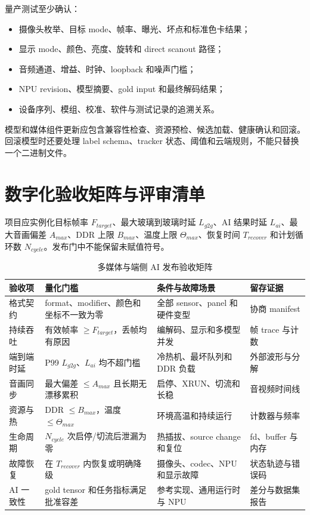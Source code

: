 量产测试至少确认：

\begin{itemize}
  \item 摄像头枚举、目标 mode、帧率、曝光、坏点和标准色卡结果；
  \item 显示 mode、颜色、亮度、旋转和 direct scanout 路径；
  \item 音频通道、增益、时钟、loopback 和噪声门槛；
  \item NPU revision、模型摘要、gold input 和最终解码结果；
  \item 设备序列、模组、校准、软件与测试记录的追溯关系。
\end{itemize}

模型和媒体组件更新应包含兼容性检查、资源预检、候选加载、健康确认和回滚。回滚模型时还要处理 label schema、tracker 状态、阈值和云端规则，不能只替换一个二进制文件。

\section{数字化验收矩阵与评审清单}

项目应实例化目标帧率 $F_{target}$、最大玻璃到玻璃时延 $L_{g2g}$、AI 结果时延 $L_{ai}$、最大音画偏差 $A_{max}$、DDR 上限 $B_{max}$、温度上限 $\Theta_{max}$、恢复时间 $T_{recover}$ 和计划循环数 $N_{cycle}$。发布门中不能保留未赋值符号。

\begin{table}[H]
  \centering
  \caption{多媒体与端侧 AI 发布验收矩阵}
  \begin{tabular}{p{28mm}p{41mm}p{41mm}p{27mm}}
    \hline
    验收项 & 量化门槛 & 条件与故障场景 & 留存证据 \\
    \hline
    格式契约 & format、modifier、颜色和坐标不一致为零 & 全部 sensor、panel 和硬件变型 & 协商 manifest \\
    持续吞吐 & 有效帧率 $\geq F_{target}$，丢帧均有原因 & 编解码、显示和多模型并发 & 帧 trace 与计数 \\
    端到端时延 & P99 $L_{g2g}$、$L_{ai}$ 均不超门槛 & 冷热机、最坏队列和 DDR 负载 & 外部波形与分解 \\
    音画同步 & 最大偏差 $\leq A_{max}$ 且长期无漂移累积 & 启停、XRUN、切流和长稳 & 音视频时间线 \\
    资源与热 & DDR $\leq B_{max}$，温度 $\leq\Theta_{max}$ & 环境高温和持续运行 & 计数器与频率 \\
    生命周期 & $N_{cycle}$ 次启停/切流后泄漏为零 & 热插拔、source change 和复位 & fd、buffer 与内存 \\
    故障恢复 & 在 $T_{recover}$ 内恢复或明确降级 & 摄像头、codec、NPU 和显示故障 & 状态轨迹与错误码 \\
    AI 一致性 & gold tensor 和任务指标满足批准容差 & 参考实现、通用运行时与 NPU & 差分与数据集报告 \\
    \hline
  \end{tabular}
\end{table}


